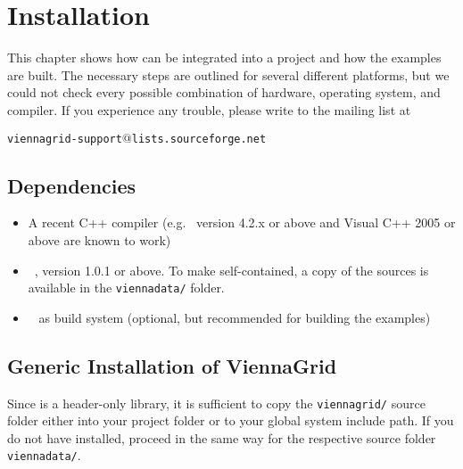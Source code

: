 \chapter{Installation}

 

This chapter shows how {\ViennaGrid} can be integrated into a project and how
the examples are built. The necessary steps are outlined for several different
platforms, but we could not check every possible combination of hardware,
operating system, and compiler. If you experience any trouble, please write to
the mailing list at \\
\begin{center}
\texttt{viennagrid-support$@$lists.sourceforge.net} 
\end{center}


\section{Dependencies}
\label{dependencies}

\begin{itemize}
 \item A recent C++ compiler (e.g.~{\GCC} version 4.2.x or above and Visual C++
2005 or above are known to work)
 \item {\ViennaData}~\cite{ViennaData}, version 1.0.1 or above. To make {\ViennaGrid} self-contained, a copy of the {\ViennaData} sources is available in the \lstinline|viennadata/| folder.
 \item {\CMake}~\cite{cmake} as build system (optional, but recommended
for building the examples)
\end{itemize}


\section{Generic Installation of ViennaGrid} \label{sec:viennagrid-installation}
Since {\ViennaGrid} is a header-only library, it is sufficient to copy the 
\lstinline|viennagrid/| source folder either into your project folder or to your global system
include path. If you do not have {\ViennaData} installed, proceed in the same way for the respective source folder \lstinline|viennadata/|. 

